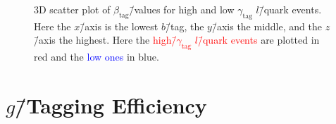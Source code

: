 \begin{figure}[h!]
  \centering
  \vspace{2mm}
  \caption[3D Scatter Plot of $\beta_\mathrm{tag}$\=/Values for High and Low $\gamma_\mathrm{tag}$ $l$\=/Quark Events]{
    3D scatter plot of $\beta_\mathrm{tag}$\=/values for high and low $\gamma_\mathrm{tag}$ $l$\=/quark events. Here the $x$\=/axis is the lowest $b$\=/tag, the $y$\=/axis
  the middle, and the $z$\=/axis the highest. Here the \textcolor{red}{high\=/$\gamma_\mathrm{tag}$ $l$\=/quark events} are plotted in red and the \textcolor{blue}{low ones} in blue.}
  \label{fig:q:gtag_scores_3j_l_quarks_3d}%
\end{figure}


\section[g-Tagging Efficiency]{$g$\=/Tagging Efficiency}
\label{sec:q:g_tagging_effiency}


